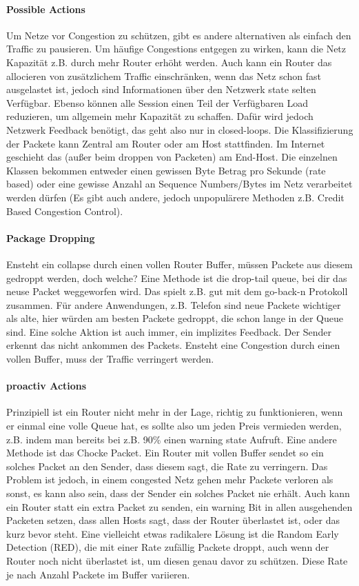			\paragraph{Possible Actions}
				Um Netze vor Congestion zu schützen, gibt es andere alternativen als einfach den Traffic zu pausieren. Um häufige Congestions entgegen zu wirken, kann die Netz Kapazität z.B. durch mehr Router erhöht werden. Auch kann ein Router das allocieren von zusätzlichem Traffic einschränken, wenn das Netz schon fast ausgelastet ist, jedoch sind Informationen über den Netzwerk state selten Verfügbar. Ebenso können alle Session einen Teil der Verfügbaren Load reduzieren, um allgemein mehr Kapazität zu schaffen. Dafür wird jedoch Netzwerk Feedback benötigt, das geht also nur in closed-loops. 
				Die Klassifizierung der Packete kann Zentral am Router oder am Host stattfinden. Im Internet geschieht das (außer beim droppen von Packeten) am End-Host. Die einzelnen Klassen bekommen entweder einen gewissen Byte Betrag pro Sekunde (rate based) oder eine gewisse Anzahl an Sequence Numbers/Bytes im Netz verarbeitet werden dürfen (Es gibt auch andere, jedoch unpopulärere Methoden z.B. Credit Based Congestion Control).
			
			\paragraph{Package Dropping}
				Ensteht ein collapse durch einen vollen Router Buffer, müssen Packete aus diesem gedroppt werden, doch welche? Eine Methode ist die drop-tail queue, bei dir das neuse Packet weggeworfen wird. Das spielt z.B. gut mit dem go-back-n Protokoll zusammen. Für andere Anwendungen, z.B. Telefon sind neue Packete wichtiger als alte, hier würden am besten Packete gedroppt, die schon lange in der Queue sind. Eine solche Aktion ist auch immer, ein implizites Feedback. Der Sender erkennt das nicht ankommen des Packets. Ensteht eine Congestion durch einen vollen Buffer, muss der Traffic verringert werden. 
			
			\paragraph{proactiv Actions}
				Prinzipiell ist ein Router nicht mehr in der Lage, richtig zu funktionieren, wenn er einmal eine volle Queue hat, es sollte also um jeden Preis vermieden werden, z.B. indem man bereits bei z.B. 90\% einen warning state Aufruft. Eine andere Methode ist das Chocke Packet. Ein Router mit vollen Buffer sendet so ein solches Packet an den Sender, dass diesem sagt, die Rate zu verringern. Das Problem ist jedoch, in einem congested Netz gehen mehr Packete verloren als sonst, es kann also sein, dass der Sender ein solches Packet nie erhält. Auch kann ein Router statt ein extra Packet zu senden, ein warning Bit in allen ausgehenden Packeten setzen, dass allen Hosts sagt, dass der Router überlastet ist, oder das kurz bevor steht. Eine vielleicht etwas radikalere Lösung ist die Random Early Detection (RED), die mit einer Rate zufällig Packete droppt, auch wenn der Router noch nicht überlastet ist, um diesen genau davor zu schützen. Diese Rate je nach Anzahl Packete im Buffer variieren. 

